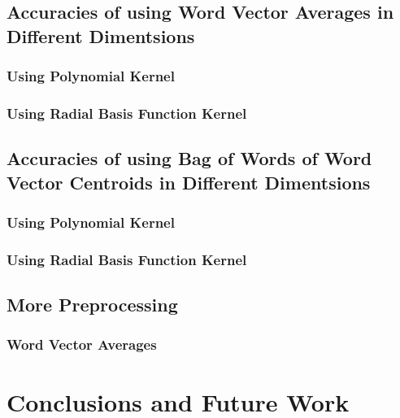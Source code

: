 \documentclass[a4paper]{llncs}
\begin{document}
\subsection{Accuracies of using Word Vector Averages in Different Dimentsions}
\subsubsection{Using Polynomial Kernel}

\subsubsection{Using Radial Basis Function Kernel}

\subsection{Accuracies of using Bag of Words of Word Vector Centroids in Different Dimentsions}
\subsubsection{Using Polynomial Kernel}
\subsubsection{Using Radial Basis Function Kernel}

\subsection{More Preprocessing}
\subsubsection{Word Vector Averages}


\section{Conclusions and Future Work}





\end{document}
